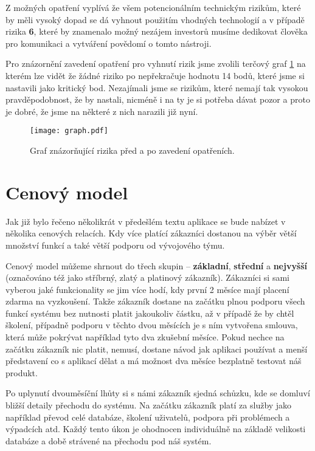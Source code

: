 \par Z možných opatření vyplívá že všem potencionálním technickým rizikům, které by měli vysoký dopad se dá vyhnout použitím vhodných technologií a v případě rizika \textbf{6}, které by znamenalo možný nezájem investorů musíme dedikovat člověka pro komunikaci a vytváření povědomí o tomto nástroji.

\par Pro znázornění zavedení opatření pro vyhnutí rizik jsme zvolili terčový graf \ref{risk-graph} na kterém lze vidět že žádné riziko po nepřekračuje hodnotu 14 bodů, které jsme si nastavili jako kritický bod. Nezajímali jsme se rizikům, které nemají tak vysokou pravděpodobnost, že by nastali, nicméně i na ty je si potřeba dávat pozor a proto je dobré, že jsme na některé z nich narazili již nyní.

\begin{figure}[ht]
\centering
\texttt{[image: graph.pdf]}
\caption{Graf znázorňující rizika před a po zavedení opatřeních.}
\label{risk-graph}
\end{figure}

\section{Cenový model}
\par Jak již bylo řečeno několikrát v předešlém textu aplikace se bude nabízet v několika cenových relacích. Kdy více platící zákazníci dostanou na výběr větší množství funkcí a také větší podporu od vývojového týmu.

\par Cenový model můžeme shrnout do třech skupin -- \textbf{základní}, \textbf{střední} a \textbf{nejvyšší} (označováno též jako stříbrný, zlatý a platinový zákazník). Zákazníci si sami vyberou jaké funkcionality se jim více hodí, kdy první 2 měsíce mají placení zdarma na vyzkoušení. Takže zákazník dostane na začátku plnou podporu všech funkcí systému bez nutnosti platit jakoukoliv částku, až v případě že by chtěl školení, případně podporu v těchto dvou měsících je s ním vytvořena smlouva, která může pokrývat například tyto dva zkušební měsíce. Pokud nechce na začátku zákazník nic platit, nemusí, dostane návod jak aplikaci používat a menší představení co s aplikací dělat a má možnost dva měsíce bezplatně testovat náš produkt.

\par Po uplynutí dvouměsíční lhůty si s námi zákazník sjedná schůzku, kde se domluví bližší detaily přechodu do systému. Na začátku zákazník platí za služby jako například převod celé databáze, školení uživatelů, podpora při problémech a výpadcích atd. Každý tento úkon je ohodnocen individuálně na základě velikosti databáze a době strávené na přechodu pod náš systém.

